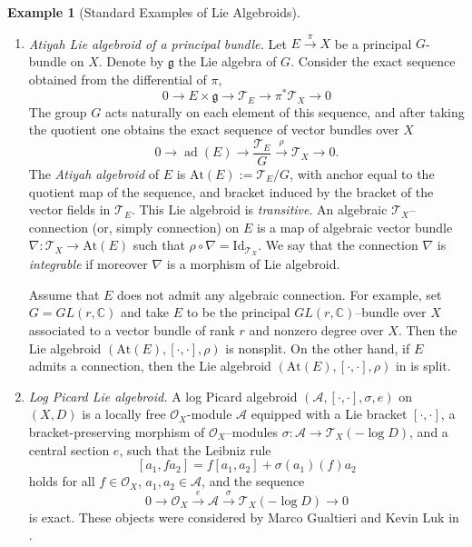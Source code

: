\documentclass[12pt,reqno]{amsart}
\numberwithin{equation}{subsection}
\theoremstyle{definition}
\newtheorem{example}[equation]{Example}
\theoremstyle{theorem}
\begin{document}
\begin{example}[Standard Examples of Lie Algebroids]
\begin{enumerate}
		\item \textit{Atiyah Lie algebroid of a principal bundle.} \label{example:Atiyah Lie algebroid of a principal bundle}
		Let $E\xrightarrow{\pi} X$ be a principal $G$-bundle on $X$. Denote by $\mathfrak{g}$ the Lie algebra of $G$. Consider the exact sequence obtained from the differential of $\pi$,
		\[0\longrightarrow E\times \mathfrak{g}\longrightarrow \mathcal{T}_{E}\longrightarrow \pi^{*}\mathcal{T}_{X}\longrightarrow 0\]The group $G$ acts naturally on each element of this sequence, and after taking the quotient one obtains the exact sequence of vector bundles over $X$
		\begin{equation}\label{Atiyah sequence for PB}
		0 \longrightarrow \operatorname{ad}(E)
		\longrightarrow \frac{\mathcal{T}_{E}}{G}
		\xrightarrow{\;\rho\;}
		\mathcal{T}_X
		\longrightarrow 0.
		\end{equation}
		The \textit{Atiyah algebroid} of $E$ is $\text{At}(E):=\mathcal{T}_{E}/G$, with anchor equal to the quotient map of the sequence, and bracket induced by the bracket of the vector fields in $\mathcal{T}_{E}$. This Lie algebroid is \emph{transitive}. An algebraic $\mathcal{T}_{X}$--connection (or, simply connection) on $E$ is a map of algebraic vector bundle $\nabla:\mathcal{T}_{X}\rightarrow \text{At}(E)$ such that $\rho\circ \nabla = \text{Id}_{\mathcal{T}_{X}}$. We say that the connection $\nabla$ is \textit{integrable} if moreover $\nabla$ is a morphism of Lie algebroid.
		
		Assume that $E$ does not admit any algebraic connection. For example, set $G = GL(r, \mathbb{C})$ and take $E$ to be the  principal $GL(r, \mathbb{C})$–bundle over $X$ associated to a vector bundle of rank $r$ and nonzero degree over $X$. Then the Lie algebroid $(\text{At}(E), [\cdot,\cdot],\rho)$ is nonsplit. On the other hand, if $E$ admits a connection, then the Lie algebroid $(\text{At}(E), [\cdot,\cdot],\rho)$ in is split.
		
		\item \textit{Log Picard Lie algebroid.} A log Picard algebroid $(\mathcal{A}, [\cdot,\cdot], \sigma, e)$ on $(X, D)$ is a locally free $\mathcal{O}_{X}$-module $\mathcal{A}$ equipped with a Lie bracket $[\cdot,\cdot]$, a bracket-preserving morphism of $\mathcal{O}_{X}$--modules $\sigma : \mathcal{A} \rightarrow
		\mathcal{T}_{X}(- \log D)$, and a central section $e$, such that the Leibniz rule
		\[[a_{1},fa_{2}]=f[a_{1},a_{2}]+\sigma(a_{1})(f)a_{2}\]
         holds for all $f \in \mathcal{O}_{X}$, $a_{1}, a_{2} \in \mathcal{A}$, and the sequence
		\[0\longrightarrow \mathcal{O}_{X}\xrightarrow{e}\mathcal{A}\xrightarrow{\sigma} \mathcal{T}_{X}(-\log D)\longrightarrow 0\]is exact. These objects were considered by Marco Gualtieri and Kevin Luk in \cite{GL-2021}.
		

\end{enumerate}
\end{example}
\end{document}
